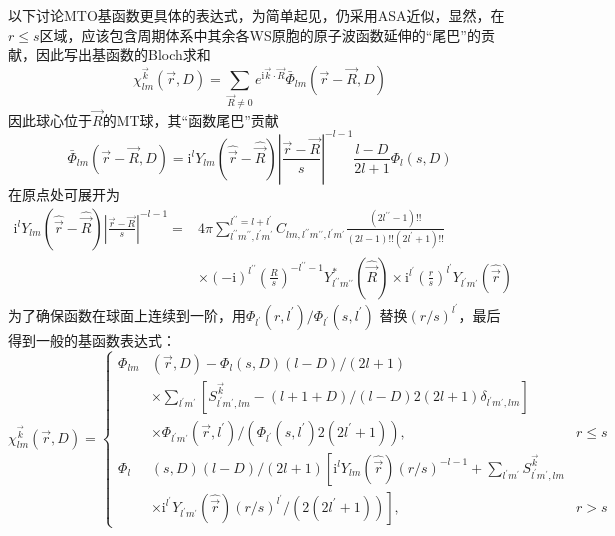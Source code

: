以下讨论MTO基函数更具体的表达式，为简单起见，仍采用ASA近似，显然，在$r\leqslant s$区域，应该包含周期体系中其余各WS原胞的原子波函数延伸的“尾巴”的贡献，因此写出基函数的Bloch求和
\begin{equation}
	\chi_{lm}^{\vec k}(\vec r,D)=\sum_{\vec R\neq0}e^{\mathrm{i}\vec k\cdot\vec R}\bar\Phi_{lm}(\vec r-\vec R,D)
  \label{eq:solid-141}
\end{equation}
因此球心位于$\vec R$的MT球，其“函数尾巴”贡献$$\bar\Phi_{lm}(\vec r-\vec R,D)=\mathrm{i}^lY_{lm}(\hat{\vec r}-\hat{\vec R})\left|\frac{\vec r-\vec R}s\right|^{-l-1}\frac{l-D}{2l+1}\Phi_l(s,D)$$
在原点处可展开为
\begin{equation}
  \begin{split}
	  \mathrm{i}^lY_{lm}(\hat{\vec r}-\hat{\vec R})\left|\frac{\vec r-\vec R}s\right|^{-l-1}=&4\pi\sum_{l^{\prime\prime}m^{\prime\prime},l^{\prime}m^{\prime}}^{l^{\prime\prime}=l+l^{\prime}}C_{lm,l^{\prime\prime}m^{\prime\prime},l^{\prime}m^{\prime}}\frac{(2l^{\prime\prime}-1)!!}{(2l-1)!!(2l^{\prime}+1)!!}\\
	  &\times(-\mathrm{i})^{l^{\prime\prime}}\left(\frac Rs\right)^{-l^{\prime\prime}-1}Y_{l^{\prime\prime}m^{\prime\prime}}^{\ast}(\hat{\vec R})\times\mathrm{i}^{l^{\prime}}\left(\frac rs\right)^{l^{\prime}}Y_{l^{\prime}m^{\prime}}(\hat{\vec r})
  \end{split}
  \label{eq:solid-142}
\end{equation}
为了确保函数在球面上连续到一阶，用$\Phi_{l^{\prime}}(r,l^{\prime})/\Phi_{l^{\prime}}(s,l^{\prime})$%
替换$(r/s)^{l^{\prime}}$，最后得到一般的基函数表达式\cite{Nemoshkalenko-Antonov}：
\begin{equation}
  \chi_{lm}^{\vec k}(\vec r,D)=\left\{
  \begin{aligned}
    \Phi_{lm}&(\vec r,D)-\Phi_l(s,D)(l-D)/(2l+1)&\\
    &\times\sum_{l^{\prime}m^{\prime}}\left[S_{l^{\prime}m^{\prime},lm}^{\vec k}-(l+1+D)/(l-D)2(2l+1)\delta_{l^{\prime}m^{\prime},lm}\right]\quad&\\
    &\times\Phi_{l^{\prime}m^{\prime}}(\vec r,l^{\prime})/(\Phi_{l^{\prime}}(s,l^{\prime})2(2l^{\prime}+1)), &r\leqslant s\\
    \Phi_l&(s,D)(l-D)/(2l+1)\left[\mathrm{i}^lY_{lm}(\hat{\vec r})(r/s)^{-l-1}\right.+\sum_{l^{\prime}m^{\prime}}S_{l^{\prime}m^{\prime},lm}^{\vec k}&\\
	    &\left.\times\mathrm{i}^{l^{\prime}}Y_{l^{\prime}m^{\prime}}(\hat{\vec r})(r/s)^{l^{\prime}}/(2(2l^{\prime}+1))\right],&r>s
  \end{aligned}\right.
  \label{eq:solid-143}
\end{equation}
